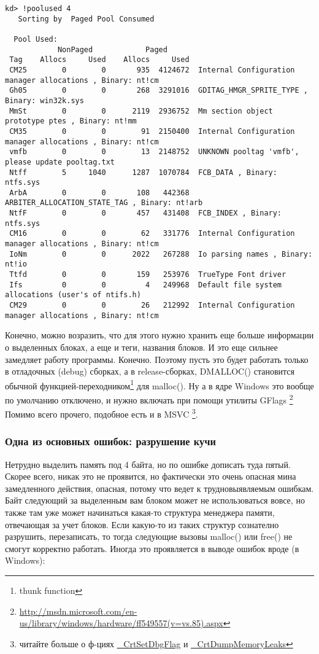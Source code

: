 \begin{lstlisting}
kd> !poolused 4
   Sorting by  Paged Pool Consumed

  Pool Used:
            NonPaged            Paged
 Tag    Allocs     Used    Allocs     Used
 CM25        0        0       935  4124672	Internal Configuration manager allocations , Binary: nt!cm
 Gh05        0        0       268  3291016	GDITAG_HMGR_SPRITE_TYPE , Binary: win32k.sys
 MmSt        0        0      2119  2936752	Mm section object prototype ptes , Binary: nt!mm
 CM35        0        0        91  2150400	Internal Configuration manager allocations , Binary: nt!cm
 vmfb        0        0        13  2148752	UNKNOWN pooltag 'vmfb', please update pooltag.txt
 Ntff        5     1040      1287  1070784	FCB_DATA , Binary: ntfs.sys
 ArbA        0        0       108   442368	ARBITER_ALLOCATION_STATE_TAG , Binary: nt!arb
 NtfF        0        0       457   431408	FCB_INDEX , Binary: ntfs.sys
 CM16        0        0        62   331776	Internal Configuration manager allocations , Binary: nt!cm
 IoNm        0        0      2022   267288	Io parsing names , Binary: nt!io
 Ttfd        0        0       159   253976	TrueType Font driver 
 Ifs         0        0         4   249968	Default file system allocations (user's of ntifs.h) 
 CM29        0        0        26   212992	Internal Configuration manager allocations , Binary: nt!cm
\end{lstlisting}

Конечно, можно возразить, что для этого нужно хранить еще больше информации о выделенных блоках, а еще
и теги, названия блоков. 
И это еще сильнее замедляет работу программы. Конечно. 
Поэтому пусть это будет работать только в отладочных (debug) сборках, 
а в release-сборках, DMALLOC() становится обычной функцией-переходником\footnote{thunk function} для malloc().
Ну а в ядре Windows это вообще по умолчанию отключено, и нужно включать при помощи утилиты GFlags
\footnote{\url{http://msdn.microsoft.com/en-us/library/windows/hardware/ff549557(v=vs.85).aspx}}
Помимо всего прочего, подобное есть и в MSVC
\footnote{читайте больше о ф-циях 
\href{http://msdn.microsoft.com/en-us/library/5at7yxcs.aspx}{\_CrtSetDbgFlag}
и
\href{http://msdn.microsoft.com/en-us/library/d41t22sb.aspx}{\_CrtDumpMemoryLeaks}}.

\subsubsection{Одна из основных ошибок: разрушение кучи}

Нетрудно выделить память под 4 байта, но по ошибке дописать туда пятый. Скорее всего, никак это не проявится,
но фактически это очень опасная мина замедленного действия, опасная, потому что ведет к трудновыявляемым
ошибкам. Байт следующий за выделенным вам блоком может не использоваться вовсе, но также там уже
может начинаться какая-то структура менеджера памяти, отвечающая за учет блоков. Если какую-то из
таких структур сознателно разрушить, перезаписать, то тогда следующие вызовы malloc() или free() не смогут
корректно работать. Иногда это проявляется в выводе ошибок вроде (в Windows):

